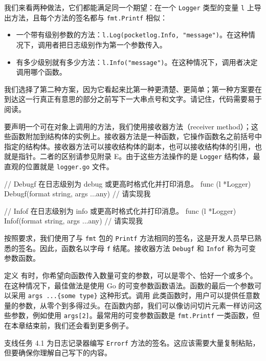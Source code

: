 我们来看两种做法，它们都能满足同一个期望：在一个 \texttt{Logger} 类型的变量 \texttt{l} 上导出方法，且每个方法的签名都与 \texttt{fmt.Printf} 相似：

\begin{itemize}
  \item 一个带有级别参数的方法：\texttt{l.Log(pocketlog.Info, "message")}。在这种情况下，调用者把日志级别作为第一个参数传入。
  \item 有多少级别就有多少方法：\texttt{l.Info("message")}。在这种情况下，调用者决定调用哪个函数。
\end{itemize}

我们选择了第二种方案，因为它看起来比第一种更清楚、更简单；第一种方案要在到达这一行真正有意思的部分之前写下一大串点号和文字。请记住，代码需要易于阅读。

要声明一个可在对象上调用的方法，我们使用接收器方法（receiver method）；这些函数附加到结构体的实例上。接收器方法是一种函数，它操作函数名之前括号中指定的结构体。接收器方法可以接收结构体的副本，也可以接收结构体的引用，也就是指针。二者的区别请参见附录 E。由于这些方法操作的是 \texttt{Logger} 结构体，最直观的位置就是 \texttt{logger.go} 文件。

\begin{gocode}[title={代码清单 4.2 logger.go：接收器方法}]
// Debugf 在日志级别为 debug 或更高时格式化并打印消息。
func (l *Logger) Debugf(format string, args ...any) {
    // 请实现我
}

// Infof 在日志级别为 info 或更高时格式化并打印消息。
func (l *Logger) Infof(format string, args ...any) {
    // 请实现我
}
\end{gocode}

按照要求，我们使用了与 \texttt{fmt} 包的 \texttt{Printf} 方法相同的签名，这是开发人员早已熟悉的签名。因此，函数名以字母 \texttt{f} 结尾。接收器方法 \texttt{Debugf} 和 \texttt{Infof} 称为可变参数函数。

\begin{infobox}{定义}
有时，你希望向函数传入数量可变的参数，可以是零个、恰好一个或多个。在这种情况下，最佳做法是使用 Go 的可变参数函数语法。函数的最后一个参数可以采用 \texttt{args ...\{some type\}} 这种形式。调用
此类函数时，用户可以提供任意数量的参数，从零个到多得过头。在函数内部，我们可以像访问切片元素一样访问这些参数，例如使用 \texttt{args[2]}。最常用的可变参数函数是 \texttt{fmt.Printf} 一类函数，但在本章结束前，我们还会看到更多例子。
\end{infobox}

\begin{infobox}{支线任务 4.1}
为日志记录器编写 \texttt{Errorf} 方法的签名。这应该需要大量复制粘贴，但要确保你理解自己写下的内容。
\end{infobox}

